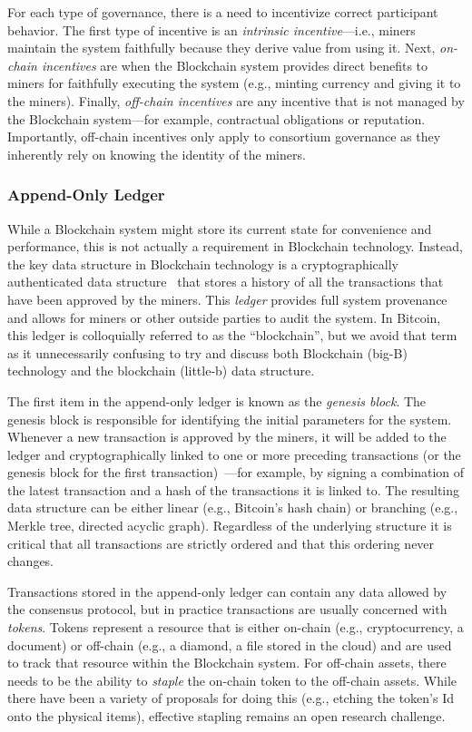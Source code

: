 For each type of governance, there is a need to incentivize correct participant behavior.
The first type of incentive is an \emph{intrinsic incentive}---i.e., miners maintain the system faithfully because they derive value from using it.
Next, \emph{on-chain incentives} are when the Blockchain system provides direct benefits to miners for faithfully executing the system (e.g., minting currency and giving it to the miners).
Finally, \emph{off-chain incentives} are any incentive that is not managed by the Blockchain system---for example, contractual obligations or reputation.
Importantly, off-chain incentives only apply to consortium governance as they inherently rely on knowing the identity of the miners.

\subsubsection{Append-Only Ledger}
While a Blockchain system might store its current state for convenience and performance, this is not actually a requirement in Blockchain technology.
Instead, the key data structure in Blockchain technology is a cryptographically authenticated data structure~\cite{tamassia2003authenticated} that stores a history of all the transactions that have been approved by the miners.
This \emph{ledger} provides full system provenance and allows for miners or other outside parties to audit the system.
In Bitcoin, this ledger is colloquially referred to as the ``blockchain'', but we avoid that term as it unnecessarily confusing to try and discuss both Blockchain (big-B) technology and the blockchain (little-b) data structure.

The first item in the append-only ledger is known as the \emph{genesis block}.
The genesis block is responsible for identifying the initial parameters for the system.
Whenever a new transaction is approved by the miners, it will be added to the ledger and cryptographically linked to one or more preceding transactions (or the genesis block for the first transaction)~\cite{bayer1993improving,haber1990time,haber1997secure}---for example, by signing a combination of the latest transaction and a hash of the transactions it is linked to.
The resulting data structure can be either linear (e.g., Bitcoin's hash chain) or branching (e.g., Merkle tree, directed acyclic graph).
Regardless of the underlying structure it is critical that all transactions are strictly ordered and that this ordering never changes.

Transactions stored in the append-only ledger can contain any data allowed by the consensus protocol, but in practice transactions are usually concerned with \emph{tokens}.
Tokens represent a resource that is either on-chain (e.g., cryptocurrency, a document) or off-chain (e.g., a diamond, a file stored in the cloud) and are used to track that resource within the Blockchain system.
For off-chain assets, there needs to be the ability to \emph{staple} the on-chain token to the off-chain assets.
While there have been a variety of proposals for doing this (e.g., etching the token's Id onto the physical items), effective stapling remains an open research challenge.

